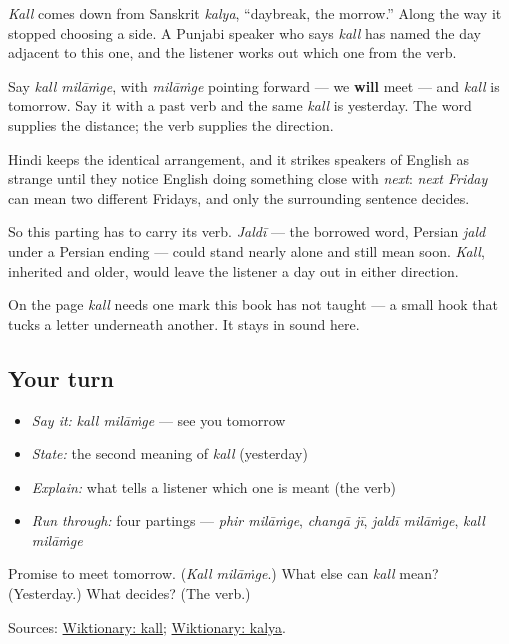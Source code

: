 \begin{cousinweb}
\emph{Kall} comes down from Sanskrit \emph{kalya}, \textquotedblleft{}daybreak, the morrow.\textquotedblright{} Along the way it stopped choosing a side. A Punjabi speaker who says \emph{kall} has named the day adjacent to this one, and the listener works out which one from the verb.

Say \emph{kall milāṁge}, with \emph{milāṁge} pointing forward — we \textbf{will} meet — and \emph{kall} is tomorrow. Say it with a past verb and the same \emph{kall} is yesterday. The word supplies the distance; the verb supplies the direction.

Hindi keeps the identical arrangement, and it strikes speakers of English as strange until they notice English doing something close with \emph{next}: \emph{next Friday} can mean two different Fridays, and only the surrounding sentence decides.

So this parting has to carry its verb. \emph{Jaldī} — the borrowed word, Persian \emph{jald} under a Persian ending — could stand nearly alone and still mean soon. \emph{Kall}, inherited and older, would leave the listener a day out in either direction.

On the page \emph{kall} needs one mark this book has not taught — a small hook that tucks a letter underneath another. It stays in sound here.
\end{cousinweb}

\subsection*{Your turn}
\begin{itemize}
\raggedright
  \item \emph{Say it:} \emph{kall milāṁge} — see you tomorrow
  \item \emph{State:} the second meaning of \emph{kall} (yesterday)
  \item \emph{Explain:} what tells a listener which one is meant (the verb)
  \item \emph{Run through:} four partings — \emph{phir milāṁge}, \emph{changā jī}, \emph{jaldī milāṁge}, \emph{kall milāṁge}
\end{itemize}

\begin{tcolorbox}[breakable,colback=teal!4,colframe=teal!35!black,title={Before you move on}]
Promise to meet tomorrow. (\emph{Kall milāṁge}.) What else can \emph{kall} mean? (Yesterday.) What decides? (The verb.)

Sources: \href{https://en.wiktionary.org/wiki/\%E0\%A8\%95\%E0\%A9\%B1\%E0\%A8\%B2\%E0\%A9\%8D\%E0\%A8\%B9}{Wiktionary: kall}; \href{https://en.wiktionary.org/wiki/\%E0\%A4\%95\%E0\%A4\%B2\%E0\%A5\%8D\%E0\%A4\%AF}{Wiktionary: kalya}.
\end{tcolorbox}
